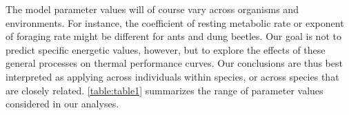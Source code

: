The model parameter values will of course vary across organisms and environments.
For instance, the coefficient of resting metabolic rate or exponent of foraging rate might be different for ants and dung beetles.
Our goal is not to predict specific energetic values, however, but to explore the effects of these general processes on thermal performance curves.
Our conclusions are thus best interpreted as applying across individuals within species, or across species that are closely related.
\cref{table:table1} summarizes the range of parameter values considered in our analyses.

